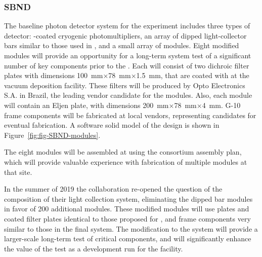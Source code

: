 \subsubsection{SBND}
\label{sec:valid-sbnd}

The baseline photon detector system for the  experiment includes three types of detector:  -coated cryogenic photomultipliers, an array of dipped light-collector bars similar to those used in , and a small array of  modules.  Eight modified  modules will provide an opportunity for a long-term system test of a significant number of key components prior to the   .  Each   will consist of two dichroic filter plates with dimensions \SI{100}{mm}$\times$\SI{78}{mm}$\times$\SI{1.5}{mm},
 that are coated with  at the  vacuum deposition facility.  These filters will be produced by Opto Electronics S.A. in Brazil, the leading vendor candidate for the   modules.  Also, each  module will contain an Eljen  plate, with dimensions 
\SI{200}{mm}$\times$\SI{78}{mm}$\times$\SI{4}{mm}. \frfour G-10 frame components will be fabricated at local vendors, representing candidates for eventual  fabrication.  A software solid model of the design is shown in Figure~\ref{fig:fig-SBND-modules}.

The eight   modules will be assembled at  using the   consortium assembly plan,
which will provide valuable experience with fabrication of multiple modules at that site.


In the summer of 2019 the  collaboration re-opened the question of the composition of their light collection system, eliminating the dipped bar modules in favor of \num{200} additional  modules.  These modified modules will use  plates and coated filter plates identical to those proposed for , and frame components very similar to those in the final   system.  The modification to the  system will provide a larger-scale long-term test of critical  components, and will significantly enhance the value of the test as a development run for the  facility.



